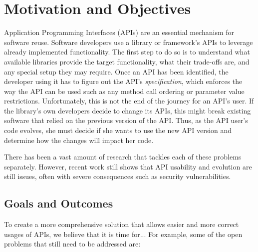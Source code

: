 \documentclass[10pt, conference]{IEEEtran}
\begin{document}
\section{Motivation and Objectives}
Application Programming Interfaces (APIs) are an essential mechanism for software reuse. Software developers use a library or framework's APIs to leverage already implemented functionality. The first step to do so is to understand what available libraries provide the target functionality, what their trade-offs are, and any special setup they may require. Once an API has been identified, the developer using it has to figure out the API's \textit{specification}, which enforces the way the API can be used such as any method call ordering or parameter value restrictions. Unfortunately, this is not the end of the journey for an API's user. If the library's own developers decide to change its APIs, this might break existing software that relied on the previous version of the API. Thus, as the API user's code evolves, she must decide if she wants to use the new API version and determine how the changes will impact her code.

There has been a vast amount of research that tackles each of these problems separately. However, recent work still shows that API usability and evolution are still issues, often with severe consequences such as security vulnerabilities. 

\subsection{Goals and Outcomes}
To create a more comprehensive solution that allows easier and more correct usages of APIs, we believe that it is time for... For example, some of the open problems that still need to be addressed are:
\end{document}
